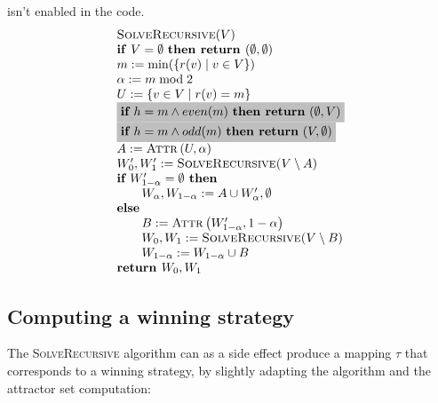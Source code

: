 \documentclass{article}
\newcommand{\Return}{\text{\textbf{return }}}
\begin{document}
isn't enabled in the code.
\begin{equation*}
\begin{array}{l}
\textsc{SolveRecursive}(V) \\ 
\text{\textbf{if} }V=\emptyset \text{ \textbf{then return }}(\emptyset
,\emptyset ) \\ 
m:=\min (\{r(v)\mid v\in V\}) \\ 
\alpha :=m \bmod 2 \\ 
U:=\{v\in V\mid r(v)=m\} \\ 
\colorbox{lightgray}{$
\textbf{if }h=m\wedge even(m)\text{ \textbf{then return} }(\emptyset,V) $}\\ 
\colorbox{lightgray}{$
\textbf{if }h=m\wedge odd(m)\text{ \textbf{then return} }(V,\emptyset) $}\\
A:=\text{\textsc{Attr}}\left( U,\alpha \right)  \\ 
W_{0}^{\prime },W_{1}^{\prime }:=\text{\textsc{SolveRecursive(}}V\setminus A%
\text{)} \\ 
\textbf{if } W_{1-\alpha }^{\prime }= \emptyset \textbf{ then} \\ 
\qquad W_{\alpha },W_{1-\alpha }:=A\cup W_{\alpha }^{\prime }, \emptyset \\ 
\text{\textbf{else}} \\ 
\qquad B:=\text{\textsc{Attr}}\left( W_{1-\alpha }^{\prime },1-\alpha \right)  \\ 
\qquad W_{0},W_{1}:=\text{\textsc{SolveRecursive(}}V\setminus B\text{)} \\ 
\qquad W_{1-\alpha }:=W_{1-\alpha }\cup B \\ 
\Return W_{0},W_{1}%
\end{array}%
\end{equation*}%


\subsection{Computing a winning strategy}

The \textsc{SolveRecursive} algorithm can as a side effect produce a mapping $\tau$ that
corresponds to a winning strategy, by slightly adapting the algorithm and the attractor set computation:
\end{document}
